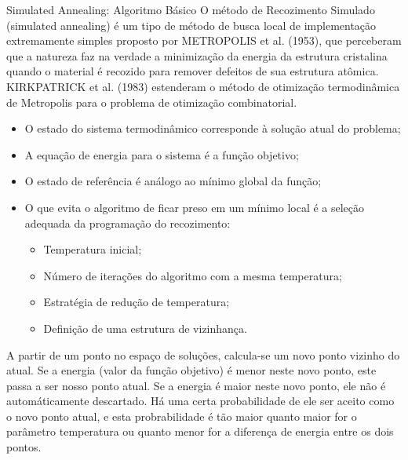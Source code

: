 \documentclass{beamer}
\begin{document}
\begin{frame}{Simulated Annealing: Algoritmo Básico}
    O método de Recozimento Simulado (simulated annealing) é um tipo de método de busca
local de implementação extremamente simples proposto por METROPOLIS et al. (1953), que
perceberam que a natureza faz na verdade a minimização da energia da estrutura cristalina quando o
material é recozido para remover defeitos de sua estrutura atômica. KIRKPATRICK et al. (1983)
estenderam o método de otimização termodinâmica de Metropolis para o problema de otimização
combinatorial.
\end{frame}

\begin{frame}
    \begin{itemize}
        \item O estado do sistema termodinâmico corresponde à solução atual do problema;
        \item A equação de energia para o sistema é a função objetivo;
        \item O estado de referência é análogo ao mínimo global da função;
        \item O que evita o algoritmo de ficar preso em um mínimo local é a seleção adequada da programação do recozimento:
        \begin{itemize}
            \item Temperatura inicial;
            \item Número de iterações do algoritmo com a mesma temperatura;
            \item Estratégia de redução de temperatura;
            \item Definição de uma estrutura de vizinhança.
        \end{itemize}
    \end{itemize}
\end{frame}

\begin{frame}
    A partir de um ponto no espaço de soluções, calcula-se um novo ponto vizinho do atual. 
    Se a energia (valor da função objetivo) é menor neste novo ponto, este passa a ser nosso 
    ponto atual. Se a energia é maior neste novo ponto, ele não é automáticamente descartado. 
    Há uma certa probabilidade de ele ser aceito como o novo ponto atual, e esta probrabilidade 
    é tão maior quanto maior for o parâmetro temperatura ou quanto menor for a diferença de 
    energia entre os dois pontos.
\end{frame}
\end{document}

